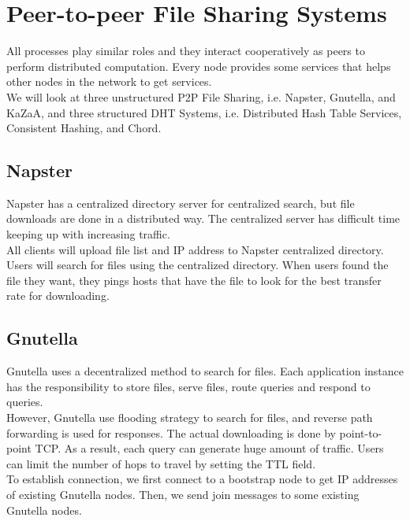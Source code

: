 \chapter{Peer-to-peer File Sharing Systems}
\begin{multicols*}{2}

\noindent All processes play similar roles and they interact cooperatively as peers to perform distributed computation. Every node provides some services that helps other nodes in the network to get services. \\

\noindent We will look at three unstructured P2P File Sharing, i.e. Napster, Gnutella, and KaZaA, and three structured DHT Systems, i.e. Distributed Hash Table Services, Consistent Hashing, and Chord.

\section{Napster}

\noindent Napster has a centralized directory server for centralized search, but file downloads are done in a distributed way. The centralized server has difficult time keeping up with increasing traffic.\\

\noindent All clients will upload file list and IP address to Napster centralized directory. Users will search for files using the centralized directory. When users found the file they want, they pings hosts that have the file to look for the best transfer rate for downloading.

\section{Gnutella}

\noindent Gnutella uses a decentralized method to search for files. Each application instance has the responsibility to store files, serve files, route queries and respond to queries. \\

\noindent However, Gnutella use flooding strategy to search for files, and reverse path forwarding is used for responses. The actual downloading is done by point-to-point TCP. As a result, each query can generate huge amount of traffic. Users can limit the number of hops to travel by setting the TTL field.\\

\noindent To establish connection, we first connect to a bootstrap node to get IP addresses of existing Gnutella nodes. Then, we send join messages to some existing Gnutella nodes.


\end{multicols*}
